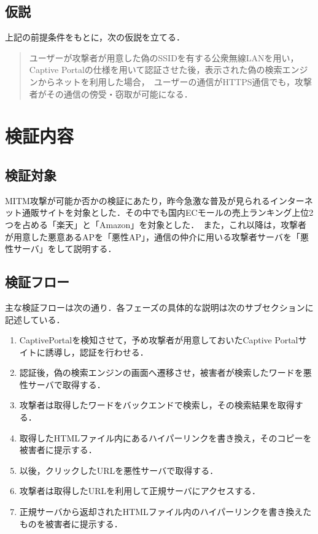\documentclass[dvipdfmx]{jsarticle}
\begin{document}
        \subsection{仮説}
            上記の前提条件をもとに，次の仮説を立てる．
            \begin{quote}
                ユーザーが攻撃者が用意した偽のSSIDを有する公衆無線LANを用い，Captive Portalの仕様を用いて認証させた後，表示された偽の検索エンジンからネットを利用した場合，\
                ユーザーの通信がHTTPS通信でも，攻撃者がその通信の傍受・窃取が可能になる．
            \end{quote}
    \section{検証内容}
        \subsection{検証対象}
            MITM攻撃が可能か否かの検証にあたり，昨今急激な普及が見られるインターネット通販サイトを対象とした．その中でも国内ECモールの売上ランキング上位2つを占める「楽天」と「Amazon」を対象とした．\
            また，これ以降は，攻撃者が用意した悪意あるAPを「悪性AP」，通信の仲介に用いる攻撃者サーバを「悪性サーバ」をして説明する．
        \subsection{検証フロー}
            主な検証フローは次の通り．各フェーズの具体的な説明は次のサブセクションに記述している．
            \begin{enumerate}
                \item CaptivePortalを検知させて，予め攻撃者が用意しておいたCaptive Portalサイトに誘導し，認証を行わせる．
                \item 認証後，偽の検索エンジンの画面へ遷移させ，被害者が検索したワードを悪性サーバで取得する．
                \item 攻撃者は取得したワードをバックエンドで検索し，その検索結果を取得する．
                \item 取得したHTMLファイル内にあるハイパーリンクを書き換え，そのコピーを被害者に提示する．
                \item 以後，クリックしたURLを悪性サーバで取得する．
                \item 攻撃者は取得したURLを利用して正規サーバにアクセスする．
                \item 正規サーバから返却されたHTMLファイル内のハイパーリンクを書き換えたものを被害者に提示する．
            \end{enumerate}
\end{document}
